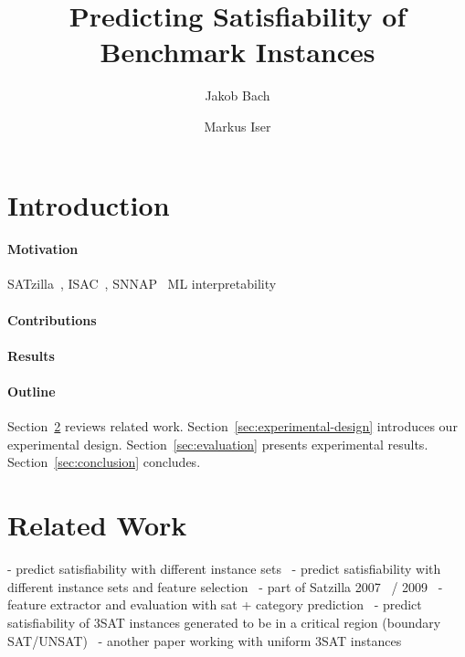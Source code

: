 \documentclass{article}
\title{Predicting Satisfiability of Benchmark Instances}
\author{Jakob Bach \and Markus Iser}
\begin{document}
\maketitle

\begin{abstract}

\end{abstract}

\section{Introduction}
\label{sec:introduction}

\paragraph{Motivation}

SATzilla~\cite{xu2008satzilla, xu2012satzilla2012}, ISAC~\cite{kadioglu2010isac}, SNNAP~\cite{collautti2013snnap}
ML interpretability~\cite{carvalho2019machine, gilpin2018explaining}

\paragraph{Contributions}

\paragraph{Results}

\paragraph{Outline}

Section~\ref{sec:related-work} reviews related work.
Section~\ref{sec:experimental-design} introduces our experimental design.
Section~\ref{sec:evaluation} presents experimental results.
Section~\ref{sec:conclusion} concludes.

\section{Related Work}
\label{sec:related-work}

- predict satisfiability with different instance sets~\cite{devlin2008satisfiability}
- predict satisfiability with different instance sets and feature selection~\cite{xu2007hierarchical}
  - part of Satzilla 2007~\cite{xu2007satzilla} / 2009~\cite{xu2008satzilla}
- feature extractor and evaluation with sat + category prediction~\cite{provan2022satfeatpy}
- predict satisfiability of 3SAT instances generated to be in a critical region (boundary SAT/UNSAT)~\cite{xu2012predicting}
- another paper working with uniform 3SAT instances~\cite{leyton2014understanding}
\end{document}
